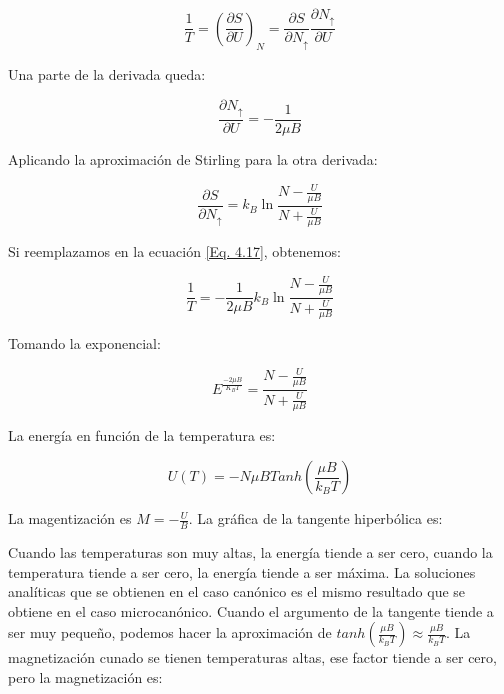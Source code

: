 \documentclass[11pt,fleqn]{book}
\begin{document}
\begin{equation}
        \frac{1}{T}=\left(\frac{\partial S}{\partial U}\right)_{N}=\frac{\partial S}{\partial N_{\uparrow}}\frac{\partial N_{\uparrow}}{\partial U}
    \label{Eq. 4.17}
\end{equation}

Una parte de la derivada queda:

\begin{equation}
        \frac{\partial N_{\uparrow}}{\partial U}=-\frac{1}{2\mu B}
    \label{Eq. 4.18}
\end{equation}
 
Aplicando la aproximación de Stirling para la otra derivada:

\begin{equation}
        \frac{\partial S}{\partial N_{\uparrow}}=k_{B}\ln{\frac{N-\frac{U}{\mu B}}{N+\frac{U}{\mu B}}}
    \label{Eq. 4.19}
\end{equation}

Si reemplazamos en la ecuación \ref{Eq. 4.17}, obtenemos:

\begin{equation}
    \frac{1}{T}=-\frac{1}{2\mu B}k_{B}\ln{\frac{N-\frac{U}{\mu B}}{N+\frac{U}{\mu B}}}
    \label{Eq. 4.20}
\end{equation}

Tomando la exponencial:

\begin{equation}
    E^{\frac{-2\mu B}{K_{B}T}}=\frac{N-\frac{U}{\mu B}}{N+\frac{U}{\mu B}}
        \label{Eq. 4.21}
\end{equation}

La energía en función de la temperatura es:

\begin{equation}
    U(T)=-N\mu BTanh(\frac{\mu B}{k_{B}T})
    \label{Eq. 4.22}
\end{equation}

La magentización es $M=-\frac{U}{B}$. La gráfica de la tangente hiperbólica es:


Cuando las temperaturas son muy altas, la energía tiende a ser cero, cuando la temperatura tiende a ser cero, la energía tiende a ser máxima. La soluciones analíticas que se obtienen en el caso canónico es el mismo resultado que se obtiene en el caso microcanónico. Cuando el argumento de la tangente tiende a ser muy pequeño, podemos hacer la aproximación de $tanh(\frac{\mu B}{k_{B}T})\approx\frac{\mu B}{k_{B}T}$. La magnetización cunado se tienen temperaturas altas, ese factor tiende a ser cero, pero la magnetización es:
\end{document}
